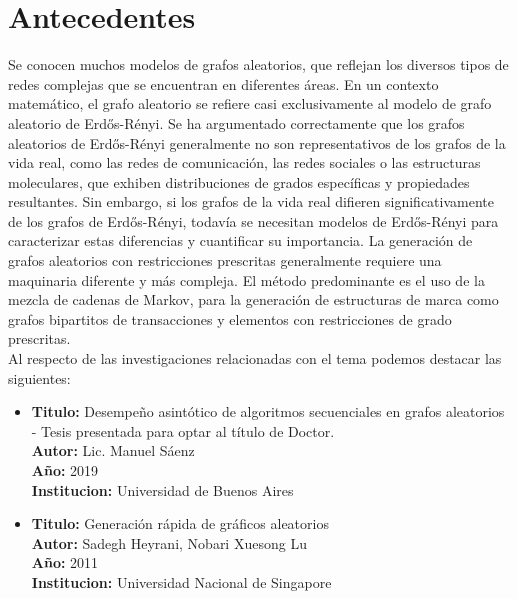 \documentclass[11pt]{extarticle}
\begin{document}
\section{Antecedentes}
Se conocen muchos modelos de grafos aleatorios, que reflejan los diversos tipos de redes
complejas que se encuentran en diferentes áreas. En un contexto matemático, el grafo aleatorio 
se refiere casi exclusivamente al modelo de grafo aleatorio de Erdős-Rényi. 
Se ha argumentado correctamente que los grafos aleatorios de Erdős-Rényi
generalmente no son representativos de los grafos de la vida real, como las redes de comunicación,
las redes sociales o las estructuras moleculares, que exhiben distribuciones de grados específicas y propiedades 
resultantes. Sin embargo, si los grafos de la vida real difieren significativamente de los grafos 
de Erdős-Rényi, todavía se necesitan modelos de Erdős-Rényi para caracterizar estas diferencias y cuantificar 
su importancia. La generación de grafos aleatorios con restricciones prescritas generalmente requiere una maquinaria diferente 
y más compleja. El método predominante es el uso de la mezcla de cadenas de Markov, para la generación de estructuras 
de marca como grafos bipartitos de transacciones y elementos con restricciones de grado prescritas.\\

Al respecto de las investigaciones relacionadas con el tema podemos destacar las siguientes:

\begin{itemize}
  \item \textbf{Titulo:} Desempeño asintótico de algoritmos secuenciales
  en grafos aleatorios - Tesis presentada para optar al título de Doctor.\\
  \textbf{Autor:} Lic. Manuel Sáenz \\
  \textbf{A\~no:} 2019\\
  \textbf{Institucion:} Universidad de Buenos Aires\\
\end{itemize}

\begin{itemize}
  \item \textbf{Titulo:} Generación rápida de gráficos aleatorios\\
  \textbf{Autor:} Sadegh Heyrani, Nobari Xuesong Lu \\
  \textbf{A\~no:} 2011\\
  \textbf{Institucion:} Universidad Nacional de Singapore\\
\end{itemize}
\end{document}
